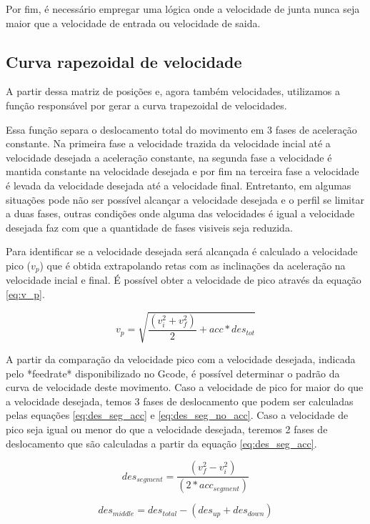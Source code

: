 Por fim, é necessário empregar uma lógica onde a velocidade de junta nunca seja maior
que a velocidade de entrada ou velocidade de saida. 

\subsection{Curva rapezoidal de velocidade}
A partir dessa matriz de posições e, agora também velocidades,
utilizamos a função responsável por gerar a curva trapezoidal de velocidades.

Essa função separa o deslocamento total do movimento em 3 fases de aceleração constante.
Na primeira fase a velocidade trazida da velocidade incial até a velocidade desejada
a aceleração constante, na segunda fase a velocidade é mantida constante na velocidade desejada
e por fim na terceira fase a velocidade é levada da velocidade desejada até a velocidade final.
Entretanto, em algumas situações pode não ser possível alcançar a velocidade desejada
e o perfil se limitar a duas fases, outras condições onde alguma das velocidades é igual a
velocidade desejada faz com que a quantidade de fases visiveis seja reduzida.

Para identificar se a velocidade desejada será alcançada é calculado a velocidade pico ($v_p$)
que é obtida extrapolando retas com as inclinações da aceleração na velocidade incial e final.
É possível obter a velocidade de pico através da equação \ref{eq:v_p}.

\begin{equation}
    \label{eq:v_p}
    v_p = \sqrt{\frac{(v_i^2+v_f^2)}{2}+acc*des_{tot}}
\end{equation}

A partir da comparação da velocidade pico com a velocidade desejada, indicada pelo *feedrate* disponibilizado no Gcode,
é possível determinar o padrão da curva de velocidade deste movimento.
Caso a velocidade de pico for maior do que a velocidade desejada, temos 3 fases de deslocamento
que podem ser calculadas pelas equações \ref{eq:des_seg_acc} e \ref{eq:des_seg_no_acc}.
Caso a velocidade de pico seja igual ou menor do que a velocidade desejada, teremos 2 fases de deslocamento
que são calculadas a partir da equação \ref{eq:des_seg_acc}.

\begin{equation}
    \label{eq:des_seg_acc}
    des_{segment} = \frac{(v_f^2-v_i^2)}{(2*acc_{segment})}
\end{equation}

\begin{equation}
    \label{eq:des_seg_no_acc}
    des_{middle} = des_{total}-(des_{up}+des_{down})
\end{equation}

